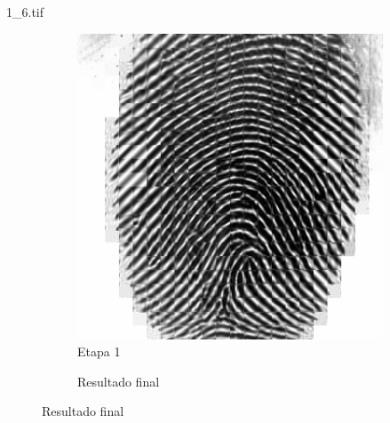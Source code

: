 \documentclass{beamer}
\begin{document}
\begin{frame}{1\_6.tif}
\begin{figure}
\begin{subfigure}[!ht]{0.32\textwidth}
                \includegraphics[width=\columnwidth]{Fingerprints/1_6_intermediate.jpg}
                \caption{Etapa 1}
            \end{subfigure}
            \begin{subfigure}[!ht]{0.32\textwidth}
                \caption{Resultado final}
            \end{subfigure}
        \end{figure}
    \end{frame}
\end{document}
